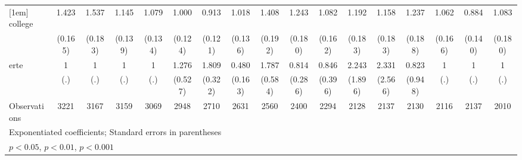 {\begin{tabular}{l*{16}{c}}
[1em]
college             &       1.423\sym{**} &       1.537\sym{***}&       1.145         &       1.079         &       1.000         &       0.913         &       1.018         &       1.408\sym{*}  &       1.243         &       1.082         &       1.192         &       1.158         &       1.237         &       1.062         &       0.884         &       1.083         \\
                    &     (0.165)         &     (0.183)         &     (0.139)         &     (0.134)         &     (0.124)         &     (0.121)         &     (0.136)         &     (0.192)         &     (0.180)         &     (0.162)         &     (0.183)         &     (0.183)         &     (0.188)         &     (0.166)         &     (0.140)         &     (0.180)         \\
[1em]
erte                &           1         &           1         &           1         &           1         &       1.276         &       1.809\sym{***}&       0.480\sym{*}  &       1.787         &       0.814         &       0.846         &       2.243         &       2.331         &       0.823         &           1         &           1         &           1         \\
                    &         (.)         &         (.)         &         (.)         &         (.)         &     (0.527)         &     (0.322)         &     (0.163)         &     (0.584)         &     (0.286)         &     (0.396)         &     (1.896)         &     (2.566)         &     (0.948)         &         (.)         &         (.)         &         (.)         \\
\hline
Observations        &        3221         &        3167         &        3159         &        3069         &        2948         &        2710         &        2631         &        2560         &        2400         &        2294         &        2128         &        2137         &        2130         &        2116         &        2137         &        2010         \\
\hline\hline
\multicolumn{17}{l}{\footnotesize Exponentiated coefficients; Standard errors in parentheses}\\
\multicolumn{17}{l}{\footnotesize \sym{*} \(p<0.05\), \sym{**} \(p<0.01\), \sym{***} \(p<0.001\)}\\
\end{tabular}
}

